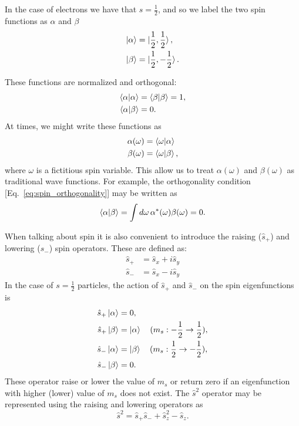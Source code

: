 \documentclass[../Main/chem532-notes.tex]{subfiles}
\begin{document}
In the case of electrons we have that $s = \frac{1}{2}$, and so we label the two spin functions as $\alpha$ and $\beta$
\begin{align}
\ket{\alpha} &= \ket{\frac{1}{2},\frac{1}{2}}, \\
\ket{\beta} &= \ket{\frac{1}{2},-\frac{1}{2}}.
\end{align}

These functions are normalized and orthogonal:
\begin{align}
\braket{\alpha | \alpha} &= \braket{\beta | \beta} = 1, \\
\braket{\alpha | \beta} &= 0. \label{eq:spin_orthogonality}
\end{align}
At times, we might write these functions as
\begin{align}
\alpha(\omega) &= \braket{\omega|\alpha} \\
\beta(\omega) &= \braket{\omega|\beta},
\end{align}
where $\omega$ is a fictitious spin variable. This allow us to treat $\alpha(\omega)$ and $\beta(\omega)$ as traditional wave functions. For example, the orthogonality condition [Eq.~\eqref{eq:spin_orthogonality}] may be written as
\begin{equation}
\braket{\alpha | \beta} = \int d\omega \, \alpha^*(\omega) \beta(\omega)  = 0.
\end{equation}

When talking about spin it is also convenient to introduce the raising ($\hat{s}_{+}$) and lowering ($\hat{s}_{-}$) spin operators.
These are defined as:
\begin{align}
\hat{s}_{+} & = \hat{s}_{x} + i \hat{s}_{y} \\
\hat{s}_{-} & = \hat{s}_{x} - i \hat{s}_{y}  
\end{align}
In the case of $s = \frac{1}{2}$ particles, the action of $\hat{s}_{+}$ and $\hat{s}_{-}$ on the spin eigenfunctions is
\begin{align}
\hat{s}_{+} \ket{\alpha} &= 0, \\
\hat{s}_{+} \ket{\beta} &= \ket{\alpha} \quad (m_s: -\frac{1}{2} \rightarrow \frac{1}{2}),\\
\hat{s}_{-} \ket{\alpha} &= \ket{\beta} \quad (m_s: \frac{1}{2} \rightarrow -\frac{1}{2}),\\
\hat{s}_{-} \ket{\beta} &= 0.
\end{align}
These operator raise or lower the value of $m_s$ or return zero if an eigenfunction with higher (lower) value of $m_s$ does not exist.
The $\hat{s}^2$ operator may be represented using the raising and lowering operators as
\begin{equation}
\hat{s}^2 = \hat{s}_{+}\hat{s}_{-} + \hat{s}^{2}_{z} - \hat{s}_{z}.
\end{equation}
\end{document}
